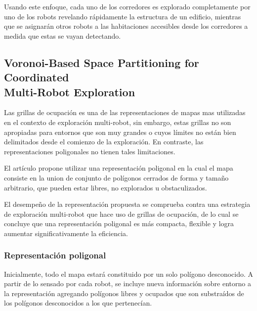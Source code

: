 Usando este enfoque, cada uno de los corredores es explorado completamente por uno de los robots revelando rápidamente la estructura de un edificio, mientras que se asignarán otros robots a las habitaciones accesibles desde los corredores a medida que estas se vayan detectando.

\subsection[Voronoi-Based Space Partitioning for Coordinated Multi-Robot Exploration]{Voronoi-Based Space Partitioning for Coordinated\\ Multi-Robot Exploration} \cite{wu2007voronoi}

Las grillas de ocupación es una de las representaciones de mapas mas utilizadas en el contexto de exploración multi-robot, sin embargo, estas grillas no son apropiadas para entornos que son muy grandes o cuyos límites no están bien delimitados desde el comienzo de la exploración. En contraste, las representaciones poligonales no tienen tales limitaciones.

El artículo propone utilizar una representación poligonal en la cual el mapa consiste en la union de conjunto de polígonos cerrados de forma y tamaño arbitrario, que pueden estar libres, no explorados u obstaculizados. 

El desempeño de la representación propuesta se comprueba contra una estrategia de exploración multi-robot que hace uso de grillas de ocupación, de lo cual se concluye que una representación poligonal es más compacta, flexible y logra aumentar significativamente la eficiencia.

\subsubsection{Representación poligonal}
Inicialmente, todo el mapa estará constituido por un solo polígono desconocido. A partir de lo sensado por cada robot, se incluye nueva información sobre entorno a la representación agregando polígonos libres y ocupados que son substraídos de los polígonos desconocidos a los que pertenecían.

